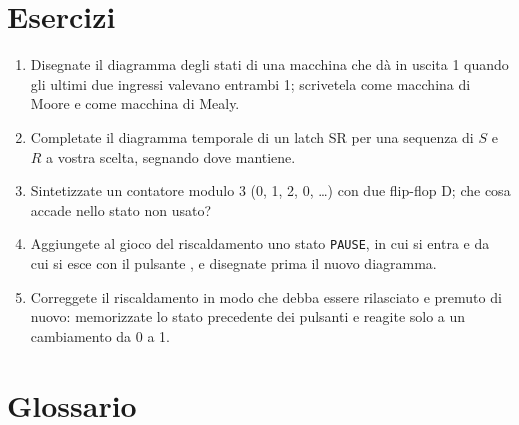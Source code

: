 \section{Esercizi}

\begin{exercise}
\begin{enumerate}[nosep]
\item Disegnate il diagramma degli stati di una macchina che dà in uscita 1
  quando gli ultimi due ingressi valevano entrambi 1; scrivetela come macchina
  di Moore e come macchina di Mealy.
\item Completate il diagramma temporale di un latch SR per una sequenza di $S$
  e $R$ a vostra scelta, segnando dove mantiene.
\item Sintetizzate un contatore modulo 3 (0, 1, 2, 0, \ldots) con due
  flip-flop D; che cosa accade nello stato non usato?
\item Aggiungete al gioco del riscaldamento uno stato \texttt{PAUSE}, in cui si
  entra e da cui si esce con il pulsante , e disegnate prima il
  nuovo diagramma.
\item Correggete il riscaldamento in modo che  debba essere rilasciato e
  premuto di nuovo: memorizzate lo stato precedente dei pulsanti e reagite solo
  a un cambiamento da 0 a 1.
\end{enumerate}
\end{exercise}

\section{Glossario}

